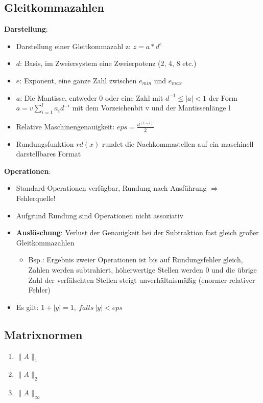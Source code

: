 \documentclass[10pt,a4paper]{article}
\newcommand{\norm}[1]{\lVert#1\rVert}
\begin{document}
	\subsection{Gleitkommazahlen}
	\textbf{Darstellung}:
	\begin{itemize}
		\item Darstellung einer Gleitkommazahl z: $z = a * d^e$
		\item $d$: Basis, im Zweiersystem eine Zweierpotenz (2, 4, 8 etc.)
		\item $e$: Exponent, eine ganze Zahl zwischen $e_{min}$ und $e_{max}$
		\item $a$: Die Mantisse, entweder 0 oder eine Zahl mit $d^{-1} \leq |a| < 1$ der Form $a = v \sum_{i = 1}^{l} a_id^{-i}$ mit dem Vorzeichenbit v und der Mantissenlänge l
		\item Relative Maschinengenauigkeit: $eps = \frac{d^{(1-l)}}{2}$
		\item Rundungsfunktion $rd(x)$ rundet die Nachkommastellen auf ein maschinell darstellbares Format
	\end{itemize}
	\newpage
	\textbf{Operationen}:
	\begin{itemize}
		\item Standard-Operationen verfügbar, Rundung nach Ausführung $\Rightarrow$ Fehlerquelle!
		\item Aufgrund Rundung sind Operationen nicht assoziativ
		\item \textbf{Auslöschung}: Verlust der Genauigkeit bei der Subtraktion fast gleich großer Gleitkommazahlen
		\begin{itemize}
			\item Bsp.: Ergebnis zweier Operationen ist bis auf Rundungsfehler gleich, Zahlen werden subtrahiert, höherwertige Stellen werden 0 und die übrige Zahl der verfälschten Stellen steigt unverhältnismäßig (enormer relativer Fehler)
		\end{itemize}
		\item Es gilt: $1 + |y| = 1,\ falls\ |y| < eps$
	\end{itemize}
	
	
	\subsection{Matrixnormen}
	\begin{enumerate}
		\item{ $\norm{A}_1$}
		\item{ $\norm{A}_2$}
		\item{ $\norm{A}_\infty$}
	\end{enumerate}
	
\end{document}
